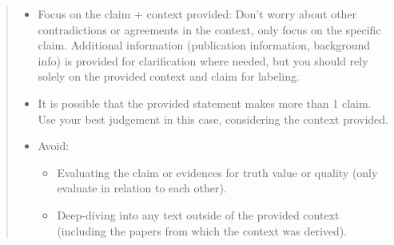 \documentclass{article}
\begin{document}
\begin{quote}
\begin{itemize}
\item Focus on the claim + context provided: Don't worry about other contradictions or agreements in the context, only focus on the specific claim. Additional information (publication information, background info) is provided for clarification where needed, but you should rely solely on the provided context and claim for labeling.
\item It is possible that the provided statement makes more than 1 claim. Use your best judgement in this case, considering the context provided.
\item Avoid:
    \begin{itemize}
        \item Evaluating the claim or evidences for truth value or quality (only evaluate in relation to each other).
        \item Deep-diving into any text outside of the provided context (including the papers from which the context was derived).
    \end{itemize}
\end{itemize}
\end{quote}
\end{document}
